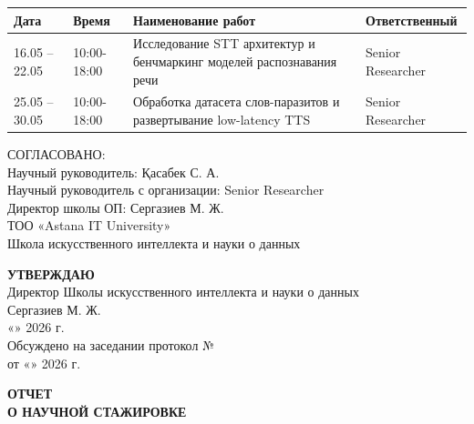 \documentclass[12pt,a4paper]{article}
\begin{document}
\vspace{2mm}
\begin{tabularx}{\textwidth}{|l|l|X|l|}
\hline
\textbf{Дата} & \textbf{Время} & \textbf{Наименование работ} & \textbf{Ответственный} \\
\hline
16.05 -- 22.05 & 10:00-18:00 & Исследование STT архитектур и бенчмаркинг моделей распознавания речи & Senior Researcher \\
\hline
25.05 -- 30.05 & 10:00-18:00 & Обработка датасета слов-паразитов и развертывание low-latency TTS & Senior Researcher \\
\hline
\end{tabularx}

\vspace{1cm}
\noindent СОГЛАСОВАНО:\\[3mm]
Научный руководитель: \underline{\hspace{4cm}} Қасабек С. А.\\[5mm]
Научный руководитель с организации: \underline{\hspace{4cm}} Senior Researcher\\[5mm]
Директор школы ОП: \underline{\hspace{4cm}} Сергазиев М. Ж.\\[5mm]

\noindent ТОО «Astana IT University»\\[2mm]
Школа искусственного интеллекта и науки о данных

\vspace{5mm}
\noindent\textbf{УТВЕРЖДАЮ}\\[2mm]
Директор Школы искусственного интеллекта и науки о данных\\[5mm]
\underline{\hspace{4cm}} Сергазиев М. Ж.\\[5mm]
«\underline{\hspace{1cm}}» \underline{\hspace{3cm}} 2026 г.\\[5mm]
Обсуждено на заседании протокол № \underline{\hspace{2cm}}\\[2mm]
от «\underline{\hspace{1cm}}» \underline{\hspace{3cm}} 2026 г.

\newpage

\begin{center}
\textbf{ОТЧЕТ}\\[2mm]
\textbf{О НАУЧНОЙ СТАЖИРОВКЕ}
\end{center}
\end{document}
